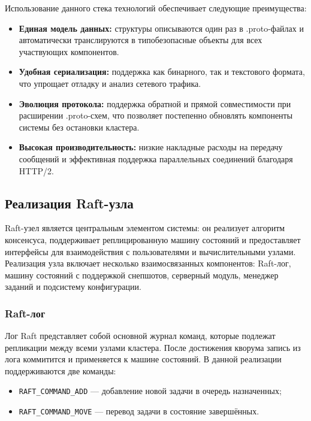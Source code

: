 Использование данного стека технологий обеспечивает следующие преимущества:
\begin{itemize}
    \item \textbf{Единая модель данных:} структуры описываются
    один раз в .proto-файлах и автоматически транслируются
    в типобезопасные объекты для всех участвующих компонентов.
    \item \textbf{Удобная сериализация:} поддержка как бинарного,
    так и текстового формата, что упрощает отладку и анализ
    сетевого трафика.
    \item \textbf{Эволюция протокола:} поддержка обратной и
    прямой совместимости при расширении .proto-схем, что позволяет
    постепенно обновлять компоненты системы без остановки кластера.
    \item \textbf{Высокая производительность:} низкие накладные расходы
    на передачу сообщений и эффективная поддержка параллельных
    соединений благодаря HTTP/2.
\end{itemize}

\subsection{Реализация Raft-узла}

Raft-узел является центральным элементом системы: он реализует алгоритм
консенсуса, поддерживает реплицированную машину состояний и предоставляет
интерфейсы для взаимодействия с пользователями и вычислительными узлами.
Реализация узла включает несколько взаимосвязанных компонентов: Raft-лог,
машину состояний с поддержкой снепшотов, серверный модуль, менеджер заданий и
подсистему конфигурации.

\subsubsection{Raft-лог}

Лог Raft представляет собой основной журнал команд, которые подлежат
репликации между всеми узлами кластера. После достижения кворума
запись из лога коммитится и применяется к машине состояний.
В данной реализации поддерживаются две команды:

\begin{itemize}
    \item \texttt{RAFT\_COMMAND\_ADD} — добавление новой задачи в очередь назначенных;
    \item \texttt{RAFT\_COMMAND\_MOVE} — перевод задачи в состояние завершённых.
\end{itemize}

